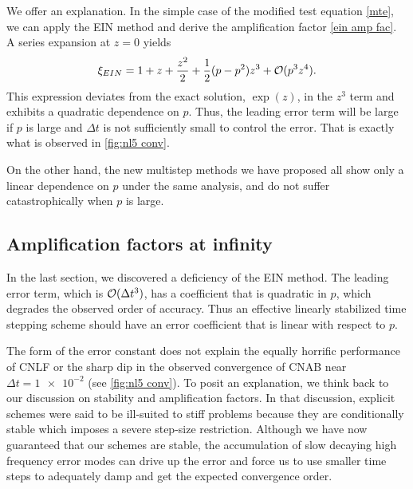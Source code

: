We offer an explanation. In the simple case of the modified test equation \cref{mte}, we can apply the EIN method and derive the amplification factor \cref{ein amp fac}. A series expansion at $z=0$ yields
\begin{align}
        \xi_{EIN}
= 1 + z + \frac{z^2}{2} + \frac{1}{2}(p-p^2)z^3 + \mathcal{O}(p^3z^4).
\end{align}
This expression deviates from the exact solution, $\exp(z)$, in the $z^3$ term and exhibits a quadratic dependence on $p$. Thus, the leading error term will be large if $p$ is large and $\Delta t$ is not sufficiently small to control the error. That is exactly what is observed in \cref{fig:nl5 conv}.

On the other hand, the new multistep methods we have proposed all show only a linear dependence on $p$ under the same analysis, and do not suffer catastrophically when $p$ is large.

\subsection{Amplification factors at infinity}
In the last section, we discovered a deficiency of the EIN method. The leading error term, which is $\mathcal{O}(\Delta t^3)$, has a coefficient that is quadratic in $p$, which degrades the observed order of accuracy. Thus an effective linearly stabilized time stepping scheme should have an error coefficient that is linear with respect to $p$. 

The form of the error constant does not explain the equally horrific performance of CNLF or the sharp dip in the observed convergence of CNAB  near $\Delta t = \num{1e-2}$ (see \cref{fig:nl5 conv}). To posit an explanation, we think back to our discussion on stability and amplification factors. In that discussion, explicit schemes were said to be ill-suited to stiff problems because they are conditionally stable which imposes a severe step-size restriction. Although we have now guaranteed that our schemes are stable, the accumulation of slow decaying high frequency error modes can drive up the error and force us to use smaller time steps to adequately damp and get the expected convergence order.

